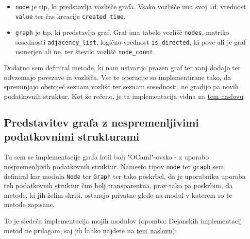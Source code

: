 \documentclass[mat1, tisk]{fmfdelo}
\begin{document}
\begin{itemize}
  \item \texttt{node} je tip, ki predstavlja vozlišče grafa. Vsako vozlišče ima svoj \texttt{id}, vrednost \texttt{value} ter čas kreacije \texttt{created\_time}.
  \item \texttt{graph} je tip, ki predstavlja graf. Graf ima tabelo vozlišč \texttt{nodes}, matriko sosednosti \texttt{adjacency\_list}, 
        logično vrednost \texttt{is\_directed}, ki pove ali je graf usmerjen ali ne, ter število vozlišč \texttt{node\_count}.
\end{itemize}

Dodatno sem definiral metode, ki nam ustvarijo prazen graf ter vanj dodajo ter odvzemajo povezave in vozlišča. Vse te operacije so implementirane tako, da spreminjajo obstoječ seznam
vozlišč ter seznam sosednosti, ne gradijo pa novih podatkovnih struktur. Kot že rečeno, je ta implementacija vidna na 
\href{https://github.com/tjazerzen/parallelisation-of-graph-algorithms-in-functional-programming-languages/blob/predstavitev_grafa_z_arrayi_ter_mnozicami/playground/graph/graph.ml}{tem naslovu}

\subsection{Predstavitev grafa z nespremenljivimi podatkovnimi strukturami} \label{sec:predstavitev_grafa_z_nespremenljivimi_podatkovnimi_strukturami}

Tu sem se implementacije grafa lotil bolj "OCaml"-ovsko - z uporabo nespremenljivih podatkovnih struktur. Namesto tipov \texttt{node} ter \texttt{graph}
sem definiral kar modula \texttt{Node} ter \texttt{Graph} ter tako poskrbel, da je uporabniku uporaba teh podatkovnih struktur čim bolj transparentna, prav tako
pa poskrbim, da metode, ki jih želim skriti, ostanejo privatne glede na modul v katerem so te metode zapisane.

To je sledeča implementacija mojih modulov (opomba: Dejanskih implementacij metod ne prilagam, saj jih lahko najdete na 
\href{https://github.com/tjazerzen/parallelisation-of-graph-algorithms-in-functional-programming-languages/blob/master/playground/graph/graph.ml}{tem naslovu}):
\end{document}
